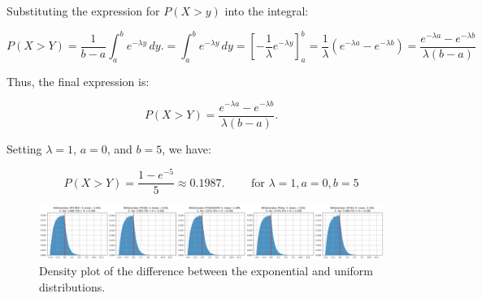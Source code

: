 \documentclass[a4paper,12pt]{article}
\renewenvironment{equation}
{\setlength{\mathindent}{0cm}%
  \begin{equation*}%
  }
  {
\end{equation*}}
\begin{document}
Substituting the expression for \(P(X > y)\) into the integral:

\begin{equation}
  P(X > Y) = \frac{1}{b-a} \int_a^b e^{-\lambda y} \, dy. =
  \int_a^b e^{-\lambda y} \, dy = {\left[ -\frac{1}{\lambda} e^{-\lambda y} \right]}_a^b = \frac{1}{\lambda}\left(e^{-\lambda a} - e^{-\lambda b}\right)
  = \frac{e^{-\lambda a} - e^{-\lambda b}}{\lambda (b-a)}
\end{equation}

Thus, the final expression is:

\begin{equation}
  \boxed{P(X > Y) = \frac{e^{-\lambda a} - e^{-\lambda b}}{\lambda (b-a)}.}
\end{equation}

Setting \(\lambda=1\), \(a=0\), and \(b=5\), we have:

\begin{equation}
  P(X > Y) = \frac{1 - e^{-5}}{5} \approx 0.1987. \qquad \text{ for } \lambda=1, a=0, b=5
\end{equation}

\begin{figure}[h]
  \centering
  \includegraphics[width=1\textwidth]{ex2-plot.png}
  \caption{Density plot of the difference between the exponential and uniform distributions.}
\end{figure}
\end{document}
